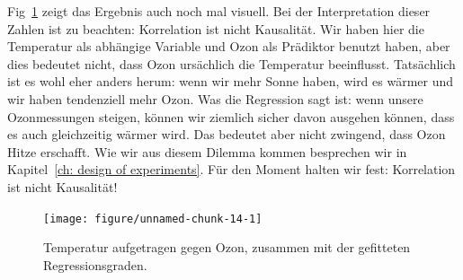 \documentclass[a4paper,twoside]{tufte-book}\usepackage[]{graphicx}\usepackage[]{color}
\begin{document}
Fig~\ref{fig: lineareRegression} zeigt das Ergebnis auch noch mal visuell. Bei der Interpretation dieser Zahlen ist zu beachten: Korrelation ist nicht Kausalität. Wir haben hier die Temperatur als abhängige Variable und Ozon als Prädiktor benutzt haben, aber dies bedeutet nicht, dass Ozon ursächlich die Temperatur beeinflusst. Tatsächlich ist es wohl eher anders herum: wenn wir mehr Sonne haben, wird es wärmer und wir haben tendenziell mehr Ozon. Was die Regression sagt ist: wenn unsere Ozonmessungen steigen, können wir ziemlich sicher davon ausgehen können, dass es auch gleichzeitig wärmer wird. Das bedeutet aber nicht zwingend, dass Ozon Hitze erschafft. Wie wir aus diesem Dilemma kommen besprechen wir in Kapitel~\ref{ch: design of experiments}. Für den Moment halten wir fest: Korrelation ist nicht Kausalität!


\begin{figure}[htbp]
\begin{center}
\begin{Schunk}

\texttt{[image: figure/unnamed-chunk-14-1]} \end{Schunk}
\caption{Temperatur aufgetragen gegen Ozon, zusammen mit der gefitteten Regressionsgraden. }
\label{fig: lineareRegression}
\end{center}
\end{figure}


\end{document}
